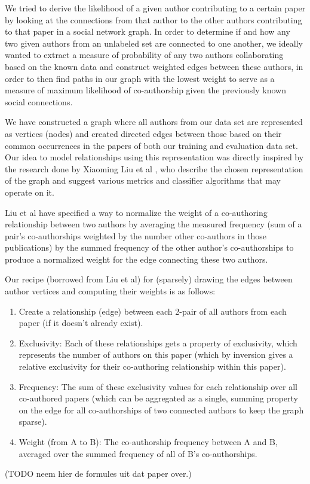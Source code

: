 
We tried to derive the likelihood of a given author contributing to a certain paper by looking at the connections from that author to the other authors contributing to that paper in a social network graph.
In order to determine if and how any two given authors from an unlabeled set are connected to one another, we ideally wanted to extract a measure of probability of any two authors collaborating based on the known data and construct weighted edges between these authors, in order to then find paths in our graph with the lowest weight to serve as a measure of maximum likelihood of co-authorship given the previously known social connections.

We have constructed a graph where all authors from our data set are represented as vertices (nodes) and created directed edges between those based on their common occurrences in the papers of both our training and evaluation data set.
Our idea to model relationships using this representation was directly inspired by the research done by Xiaoming Liu et al \cite{liu2005co}, who describe the chosen representation of the graph and suggest various metrics and classifier algorithms that may operate on it.

Liu et al have specified a way to normalize the weight of a co-authoring relationship between two authors by averaging the measured frequency (sum of a pair's co-authorships weighted by the number other co-authors in those publications) by the summed frequency of the other author's co-authorships to produce a normalized weight for the edge connecting these two authors.

Our recipe (borrowed from Liu et al) for (sparsely) drawing the edges between author vertices and computing their weights is as follows:


\begin{enumerate}
  \item Create a relationship (edge) between each 2-pair of all authors from each paper (if it doesn't already exist).
  \item Exclusivity: Each of these relationships gets a property of exclusivity, which represents the number of authors on this paper (which by inversion gives a relative exclusivity for their co-authoring relationship within this paper).
  \item Frequency: The sum of these exclusivity values for each relationship over all co-authored papers (which can be aggregated as a single, summing property on the edge for all co-authorships of two connected authors to keep the graph sparse).
  \item Weight (from A to B): The co-authorship frequency between A and B, averaged over the summed frequency of all of B's co-authorships.
\end{enumerate}
(TODO neem hier de formules uit dat paper over.)

